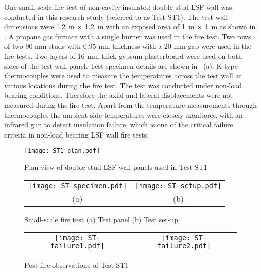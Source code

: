 One small-scale fire test of non-cavity insulated double stud LSF wall was conducted in this research study (referred to as Test-ST1). The test wall dimensions were 1.2~m \(\times\) 1.2~m with an exposed area of 1~m \(\times\) 1~m as shown in . A propane gas furnace with a single burner was used in the fire test. Two rows of two 90 mm studs with 0.95 mm thickness with a 20 mm gap were used in the fire tests. Two layers of 16 mm thick gypsum plasterboard were used on both sides of the test wall panel. Test specimen details are shown in ~(a). K-type thermocouples were used to measure the temperatures across the test wall at various locations during the fire test. The test was conducted under non-load bearing conditions. Therefore the axial and lateral displacements were not measured during the fire test. Apart from the temperature measurements through thermocouples the ambient side temperatures were closely monitored with an infrared gun to detect insulation failure, which is one of the critical failure criteria in non-load bearing LSF wall fire tests. 
\begin{figure}[htbp]
	\centering
		\texttt{[image: ST1-plan.pdf]} 
		\caption{Plan view of double stud LSF wall panels used in Test-ST1}
		\label{fig:ST1-plan}
\end{figure}
\begin{figure}[htbp]
	\centering
		\begin{tabular}{cc}
			\texttt{[image: ST-specimen.pdf]} & \texttt{[image: ST-setup.pdf]} \\ 
			(a) & (b)  \\ 
		\end{tabular} 
		\caption{Small-scale fire test (a) Test panel (b) Test set-up}
		\label{fig:ST-setup}
\end{figure}
\begin{figure}[htbp]
	\centering
		\begin{tabular}{cc}
			\texttt{[image: ST-failure1.pdf]} & \texttt{[image: ST-failure2.pdf]} \\ 
		\end{tabular} 
		\caption{Post-fire observations of Test-ST1}
		\label{fig:ST-failure}
\end{figure}

